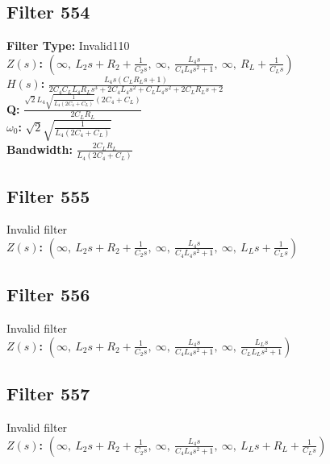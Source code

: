\documentclass{article}
\begin{document}
\subsection*{Filter 554}
\textbf{Filter Type:} Invalid110 \\ 
\textbf{$Z(s)$:} $\left( \infty, \  L_{2} s + R_{2} + \frac{1}{C_{2} s}, \  \infty, \  \frac{L_{4} s}{C_{4} L_{4} s^{2} + 1}, \  \infty, \  R_{L} + \frac{1}{C_{L} s}\right)$ \\ 
\textbf{$H(s)$:} $\frac{L_{4} s \left(C_{L} R_{L} s + 1\right)}{2 C_{4} C_{L} L_{4} R_{L} s^{3} + 2 C_{4} L_{4} s^{2} + C_{L} L_{4} s^{2} + 2 C_{L} R_{L} s + 2}$ \\ 
\textbf{Q:} $\frac{\sqrt{2} L_{4} \sqrt{\frac{1}{L_{4} \left(2 C_{4} + C_{L}\right)}} \left(2 C_{4} + C_{L}\right)}{2 C_{L} R_{L}}$ \\ 
\textbf{$\omega_0$:} $\sqrt{2} \sqrt{\frac{1}{L_{4} \left(2 C_{4} + C_{L}\right)}}$ \\ 
\textbf{Bandwidth:} $\frac{2 C_{L} R_{L}}{L_{4} \left(2 C_{4} + C_{L}\right)}$ \\ 
\subsection*{Filter 555}
Invalid filter \\ 
\textbf{$Z(s)$:} $\left( \infty, \  L_{2} s + R_{2} + \frac{1}{C_{2} s}, \  \infty, \  \frac{L_{4} s}{C_{4} L_{4} s^{2} + 1}, \  \infty, \  L_{L} s + \frac{1}{C_{L} s}\right)$ \\ 
\subsection*{Filter 556}
Invalid filter \\ 
\textbf{$Z(s)$:} $\left( \infty, \  L_{2} s + R_{2} + \frac{1}{C_{2} s}, \  \infty, \  \frac{L_{4} s}{C_{4} L_{4} s^{2} + 1}, \  \infty, \  \frac{L_{L} s}{C_{L} L_{L} s^{2} + 1}\right)$ \\ 
\subsection*{Filter 557}
Invalid filter \\ 
\textbf{$Z(s)$:} $\left( \infty, \  L_{2} s + R_{2} + \frac{1}{C_{2} s}, \  \infty, \  \frac{L_{4} s}{C_{4} L_{4} s^{2} + 1}, \  \infty, \  L_{L} s + R_{L} + \frac{1}{C_{L} s}\right)$ \\ 
\end{document}
